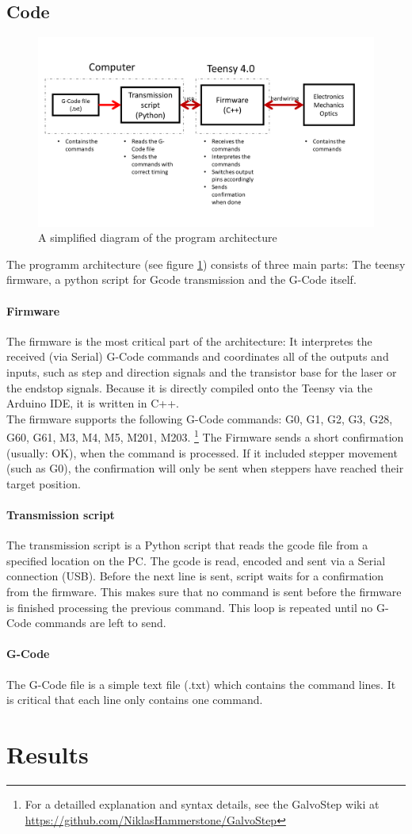 \documentclass[a4paper, 11pt]{scrartcl}
\begin{document}
\subsection{Code}
\begin{figure}[H]
\begin{center}
\includegraphics[width=15cm]{img/programArchitecture.png}
\caption{A simplified diagram of the program architecture}
\label{code}
\end{center}
\end{figure}
The programm architecture (see figure \ref{code}) consists of three main parts: The teensy firmware, a python script for Gcode transmission and the G-Code itself. 
\paragraph{Firmware}
The firmware is the most critical part of the architecture: It interpretes the received (via Serial) G-Code commands and coordinates all of the outputs and inputs, such as step and direction signals and the transistor base for the laser or the endstop signals. Because it is directly compiled onto the Teensy via the Arduino IDE, it is written in C++.\\
The firmware supports the following G-Code commands: G0, G1, G2, G3, G28, G60, G61, M3, M4, M5, M201, M203. \footnote{For a detailled explanation and syntax details, see the GalvoStep wiki at \url{https://github.com/NiklasHammerstone/GalvoStep}} The Firmware sends a short confirmation (usually: OK), when the command is processed. If it included stepper movement (such as G0), the confirmation will only be sent when steppers have reached their target position.
\paragraph{Transmission script}
The transmission script is a Python script that reads the gcode file from a specified location on the PC. The gcode is read, encoded and sent via a Serial connection (USB). Before the next line is sent, script waits for a confirmation from the firmware. This makes sure that no command is sent before the firmware is finished processing the previous command. This loop is repeated until no G-Code commands are left to send.
\paragraph{G-Code}
The G-Code file is a simple text file (.txt) which contains the command lines. It is critical that each line only contains one command.
\section{Results}
 

\end{document}
